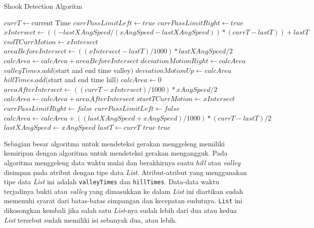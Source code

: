 \begin{algorithm}
	\caption{Shook Detection Algoritm}
	\label{alg:algoritma-pendeteksi-gerakan-menggeleng}
	\begin{algorithmic}[1]
		\State $currT \gets $current Time
			\State $currPassLimitLeft \gets true$
			\State $currPassLimitRight \gets true$
		\EndIf
			\State $xIntersect \gets ((-lastXAngSpeed / (xAngSpeed - lastXAngSpeed)) * (currT - lastT))+lastT$
			\State $endTCurrMotion \gets xIntersect$
			\State $areaBeforeIntersect \gets ((xIntersect - lastT) / 1000) * lastXAngSpeed / 2$
			\State $calcArea \gets calcArea + areaBeforeIntersect$
				\State $deviationMotionRight \gets calcArea$
					\State $valleyTimes.add($start and end time valley$)$
				\EndIf
				\State $deviationMotionUp \gets calcArea$
					\State $hillTimes.add($start and end time hill$)$
				\EndIf
			\EndIf
			\State $calcArea \gets 0$
			\State $areaAfterIntersect \gets ((currT - xIntersect) / 1000) * xAngSpeed / 2$ 
			\State $calcArea \gets calcArea + areaAfterIntersect$ 
			\State $startTCurrMotion \gets xIntersect$ 
			\State $currPassLimitRight \gets false$ 
			\State $currPassLimitLeft \gets false$ 
		\Else 
			\State $calcArea \gets calcArea + ((lastXAngSpeed + xAngSpeed) / 1000) * (currT - lastT) / 2$
		\EndIf
		\State $lastXAngSpeed \gets xAngSpeed$
		\State $lastT \gets currT$
			\Return $true$ 
			 \Return $true$
		\EndIf
	\EndFunction  
	\end{algorithmic}
\end{algorithm} 

Sebagian besar algoritma untuk mendeteksi gerakan menggeleng memiliki kemiripan dengan algoritma untuk mendeteksi gerakan mengangguk. Pada algoritma menggeleng data waktu mulai dan berakhirnya suatu \textit{hill} atau \textit{valley} disimpan pada atribut dengan tipe data \textit{List}. Atribut-atribut yang menggunakan tipe data \textit{List} ini adalah \texttt{valleyTimes} dan \texttt{hillTimes}. Data-data waktu terjadinya bukti atau \textit{valley} yang dimasukkan ke dalam \textit{List} ini diartikan sudah memenuhi syarat dari batas-batas simpangan dan kecepatan sudutnya. \texttt{List} ini dikosongkan kembali jika salah satu \textit{List}-nya sudah lebih dari dua atau kedua \textit{List} tersebut sudah memiliki isi sebanyak dua, atau lebih. 

